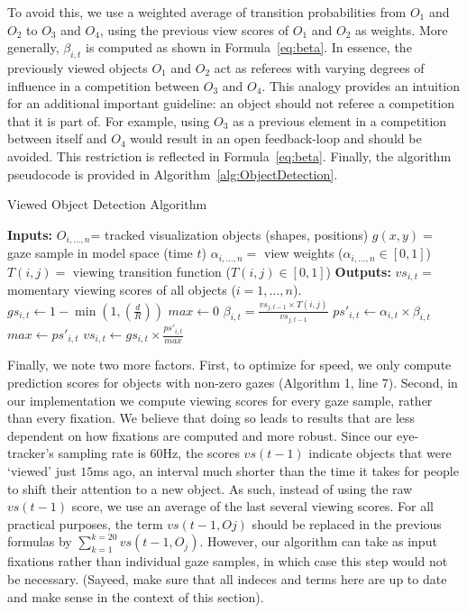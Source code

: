 To avoid this, we use a weighted average of transition probabilities from $O_1$ and $O_2$ to $O_3$ and $O_4$, using the previous view scores of $O_1$ and $O_2$ as weights.  More generally, $\beta_{i,t}$ is computed as shown in Formula~\ref{eq:beta}. In essence, the previously viewed objects $O_1$ and $O_2$ act as referees with varying degrees of influence in a competition between $O_3$ and $O_4$. This analogy provides an intuition for an additional important guideline: an object should not referee a competition that it is part of. For example, using $O_3$ as a previous element in a competition between itself and $O_4$ would result in an open feedback-loop and should be avoided. This restriction is reflected in Formula~\ref{eq:beta}.  Finally, the algorithm pseudocode is provided in Algorithm~\ref{alg:ObjectDetection}.

\begin{algorithm}
\caption{Viewed Object Detection Algorithm}
\label{alg:ObjectDetection}
\begin{algorithmic}[1]
\State \textbf{Inputs: } 
\Statex $O_{i, \ldots, n}$= tracked visualization objects (shapes, positions)
\Statex $g(x,y) = $ gaze sample in model space (time $t$)
\Statex $\alpha_{i, \ldots, n} = $ view weights ($\alpha_{i, \ldots, n} \in [0,1]$)
\Statex $T(i,j) = $ viewing transition function ($T(i,j) \in [0,1]$)
\State \textbf{Outputs:}
\Statex $vs_{i,t} = $ momentary viewing scores of all objects ($i = 1, \ldots, n$). 
	\State $gs_{i,t} \gets 1 - \min (1, (\frac{d}{R}))$	
\EndFor
\State $max \gets 0$
		\State $\beta_{i,t} = \frac{vs_{j,t-1} \times T(i,j)}{vs_{j,t-1}}$
		\State $ps'_{i,t} \gets \alpha_{i,t} \times \beta_{i,t}$
			\State $max \gets ps'_{i,t}$
		\EndIf
	\EndIf
\EndFor
{}
	\State $vs_{i,t} \gets gs_{i,t} \times \frac{ps'_{i,t}}{max} $
\EndFor
\end{algorithmic}
\end{algorithm}

Finally, we note two more factors. First, to optimize for speed, we only compute prediction scores for objects with non-zero gazes (Algorithm 1, line 7). Second, in our implementation we compute viewing scores for every gaze sample, rather than every fixation. We believe that doing so leads to results that are less dependent on how fixations are computed and more robust. Since our eye-tracker's sampling rate is $60$Hz, the scores $vs(t-1)$ indicate objects that were `viewed' just $15$ms ago, an interval much shorter than the time it takes for people to shift their attention to a new object. As such, instead of using the raw $vs(t-1)$ score, we use an average of the last several viewing scores. For all practical purposes, the term $vs(t-1,Oj)$ should be replaced in the previous formulas by $ \sum_{k=1}^{k=20}{vs(t-1, O_j)}$.  However, our algorithm can take as input fixations rather than individual gaze samples, in which case this step would not be necessary. (Sayeed, make sure that all indeces and terms here are up to date and make sense in the context of this section).

